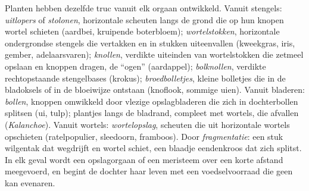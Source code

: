 \begin{proposition}\label{prop:b2:asexual-reproduction:organs}
Planten hebben dezelfde truc vanuit elk orgaan ontwikkeld. Vanuit
stengels: \emph{uitlopers} of \emph{stolonen}, horizontale scheuten langs
de grond die op hun knopen wortel schieten (aardbei, kruipende
boterbloem); \emph{wortelstokken}, horizontale ondergrondse stengels die
vertakken en in stukken uiteenvallen (kweekgras, iris, gember,
adelaarsvaren); \emph{knollen}, verdikte uiteinden van wortelstokken die
zetmeel opslaan en knoppen dragen, de ``ogen'' (aardappel);
\emph{bolknollen}, verdikte rechtopstaande stengelbases (krokus);
\emph{broedbolletjes}, kleine bolletjes die in de bladoksels of in de
bloeiwijze ontstaan (knoflook, sommige uien). Vanuit bladeren:
\emph{bollen}, knoppen omwikkeld door vlezige opslagbladeren die zich in
dochterbollen splitsen (ui, tulp); plantjes langs de bladrand, compleet met
wortels, die afvallen (\emph{Kalanchoe}). Vanuit wortels:
\emph{wortelopslag}, scheuten die uit horizontale wortels opschieten
(ratelpopulier, sleedoorn, framboos). Door \emph{fragmentatie}: een stuk
wilgentak dat wegdrijft en wortel schiet, een blaadje eendenkroos dat zich
splitst. In elk geval wordt een opslagorgaan of een meristeem over een
korte afstand meegevoerd, en begint de dochter haar leven met een
voedselvoorraad die geen  kan evenaren.
\end{proposition}

